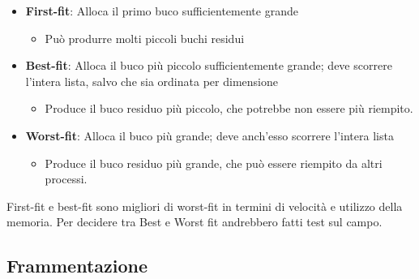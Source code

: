 \begin{itemize}
  \item \textbf{First-fit}: Alloca il primo buco sufficientemente grande
        \begin{itemize}
          \item[] Può produrre molti piccoli buchi residui
        \end{itemize}

  \item \textbf{Best-fit}: Alloca il buco più piccolo sufficientemente grande; deve scorrere l'intera lista, salvo che sia ordinata per dimensione

        \begin{itemize}
          \item[] Produce il buco residuo più piccolo, che potrebbe non essere più riempito.
        \end{itemize}

  \item \textbf{Worst-fit}: Alloca il buco più grande; deve anch'esso scorrere l'intera lista
        \begin{itemize}
          \item[] Produce il buco residuo più grande, che può essere riempito da altri processi.
        \end{itemize}
\end{itemize}

First-fit e best-fit sono migliori di worst-fit in termini di velocità e utilizzo della memoria.
Per decidere tra Best e Worst fit andrebbero fatti test sul campo.

\subsection{Frammentazione}



